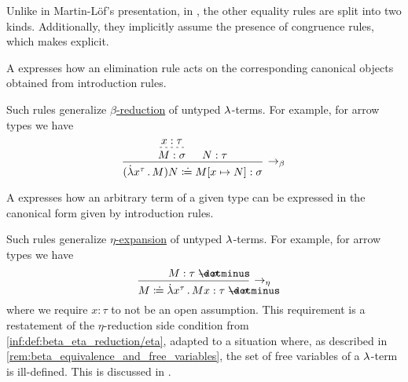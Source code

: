 \begin{remark}
\begin{thmenum}
    Unlike in Martin-L\"of's presentation, in \cite[27]{UnivalentFoundationsProgram2013HoTT}, the other equality rules are split into two kinds. Additionally, they implicitly assume the presence of congruence rules, which  makes explicit.

    \begin{thmenum}
       A  expresses how an elimination rule acts on the corresponding canonical objects obtained from introduction rules.

      Such rules generalize \hyperref[def:beta_eta_reduction]{\( \beta \)-reduction} of untyped \( {\mathrm \lambda} \)-terms. For example, for arrow types we have
      \begin{equation*}
        \begin{prooftree}
          \hypo{ x: \tau }
          \infer[dashed]1{ M: \sigma }

          \hypo{ N: \tau }
          \infer2[\ensuremath{ \rightarrow_\beta }]{ (\qabs {x^\tau} M) N \syndefeq M[x \mapsto N]: \sigma }.
        \end{prooftree}
      \end{equation*}

       A  expresses how an arbitrary term of a given type can be expressed in the canonical form given by introduction rules.

      Such rules generalize \hyperref[def:beta_eta_reduction]{\( \eta \)-expansion} of untyped \( {\mathrm \lambda} \)-terms. For example, for arrow types we have
      \begin{equation*}
        \begin{prooftree}
          \hypo{ M: \tau \synimplies \sigma }
          \infer1[\ensuremath{ \rightarrow_\eta }]{ M \syndefeq \qabs {x^\tau} M x: \tau \synimplies \sigma },
        \end{prooftree}
      \end{equation*}
      where we require \( x: \tau \) to not be an open assumption. This requirement is a restatement of the \( \eta \)-reduction side condition from \ref{inf:def:beta_eta_reduction/eta}, adapted to a situation where, as described in \cref{rem:beta_equivalence_and_free_variables}, the set of free variables of a \( {\mathrm \lambda} \)-term is ill-defined. This is discussed in \cite{MathSE:dependent_type_theory_and_free_variables}.


\end{thmenum}
\end{thmenum}
\end{remark}
